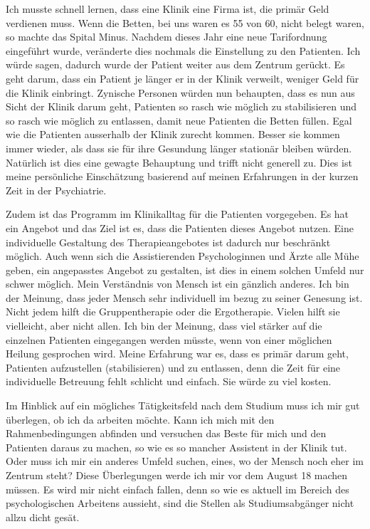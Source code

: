 Ich musste schnell lernen, dass eine Klinik eine Firma ist, die primär Geld verdienen muss. Wenn die Betten, bei uns waren es 55 von 60, nicht belegt waren, so machte das Spital Minus. Nachdem dieses Jahr eine neue Tarifordnung eingeführt wurde, veränderte dies nochmals die Einstellung zu den Patienten. Ich würde sagen, dadurch wurde der Patient weiter aus dem Zentrum gerückt. Es geht darum, dass ein Patient je länger er in der Klinik verweilt, weniger Geld für die Klinik einbringt. Zynische Personen würden nun behaupten, dass es nun aus Sicht der Klinik darum geht, Patienten so rasch wie möglich zu stabilisieren und so rasch wie möglich zu entlassen, damit neue Patienten die Betten füllen. Egal wie die Patienten ausserhalb der Klinik zurecht kommen. Besser sie kommen immer wieder, als dass sie für ihre Gesundung länger stationär bleiben würden. Natürlich ist dies eine gewagte Behauptung und trifft nicht generell zu. Dies ist meine persönliche Einschätzung basierend auf meinen Erfahrungen in der kurzen Zeit in der Psychiatrie. 

Zudem ist das Programm im Klinikalltag für die Patienten vorgegeben. Es hat ein Angebot und das Ziel ist es, dass die Patienten dieses Angebot nutzen. Eine individuelle Gestaltung des Therapieangebotes ist dadurch nur beschränkt möglich. Auch wenn sich die Assistierenden Psychologinnen und Ärzte alle Mühe geben, ein angepasstes Angebot zu gestalten, ist dies in einem solchen Umfeld nur schwer möglich. Mein Verständnis von Mensch ist ein gänzlich anderes. Ich bin der Meinung, dass jeder Mensch sehr individuell im bezug zu seiner Genesung ist. Nicht jedem hilft die Gruppentherapie oder die Ergotherapie. Vielen hilft sie vielleicht, aber nicht allen. Ich bin der Meinung, dass viel stärker auf die einzelnen Patienten eingegangen werden müsste, wenn von einer möglichen Heilung gesprochen wird. Meine Erfahrung war es, dass es primär darum geht, Patienten aufzustellen (stabilisieren) und zu entlassen, denn die Zeit für eine individuelle Betreuung fehlt schlicht und einfach. Sie würde zu viel kosten. 

Im Hinblick auf ein mögliches Tätigkeitsfeld nach dem Studium muss ich mir gut überlegen, ob ich da arbeiten möchte. Kann ich mich mit den Rahmenbedingungen abfinden und versuchen das Beste für mich und den Patienten daraus zu machen, so wie es so mancher Assistent in der Klinik tut. Oder muss ich mir ein anderes Umfeld suchen, eines, wo der Mensch noch eher im Zentrum steht? Diese Überlegungen werde ich mir vor dem August 18 machen müssen. Es wird mir nicht einfach fallen, denn so wie es aktuell im Bereich des psychologischen Arbeitens aussieht, sind die Stellen als Studiumsabgänger nicht allzu dicht gesät.
    
